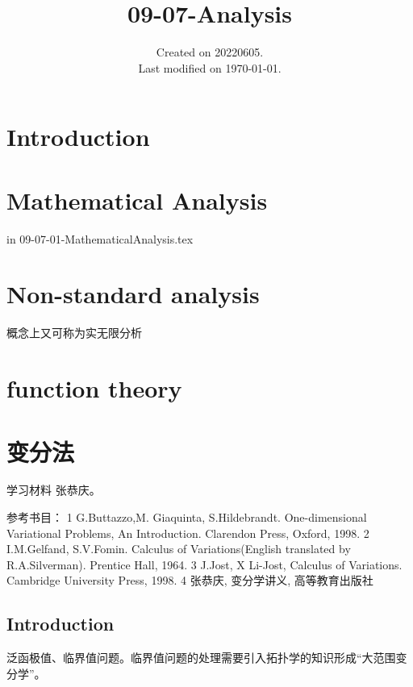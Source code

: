 \documentclass[UTF8]{../09-Mathematics}
\begin{document}
\title{09-07-Analysis}
\date{Created on 20220605.\\   Last modified on \today.}
\maketitle
\tableofcontents


\chapter{Introduction}




\chapter{Mathematical Analysis}%
in 09-07-01-MathematicalAnalysis.tex







\chapter{Non-standard analysis}

概念上又可称为实无限分析



\chapter{function theory}%








\chapter{变分法}
学习材料 张恭庆。

参考书目：
1 G.Buttazzo,M. Giaquinta, S.Hildebrandt. One-dimensional Variational Problems, An Introduction. Clarendon Press, Oxford, 1998.
2 I.M.Gelfand, S.V.Fomin. Calculus of Variations(English translated by R.A.Silverman). Prentice Hall, 1964.
3 J.Jost, X Li-Jost, Calculus of Variations. Cambridge University Press, 1998.
4 张恭庆, 变分学讲义, 高等教育出版社

\section{Introduction}
泛函极值、临界值问题。临界值问题的处理需要引入拓扑学的知识形成“大范围变分学”。
\end{document}
